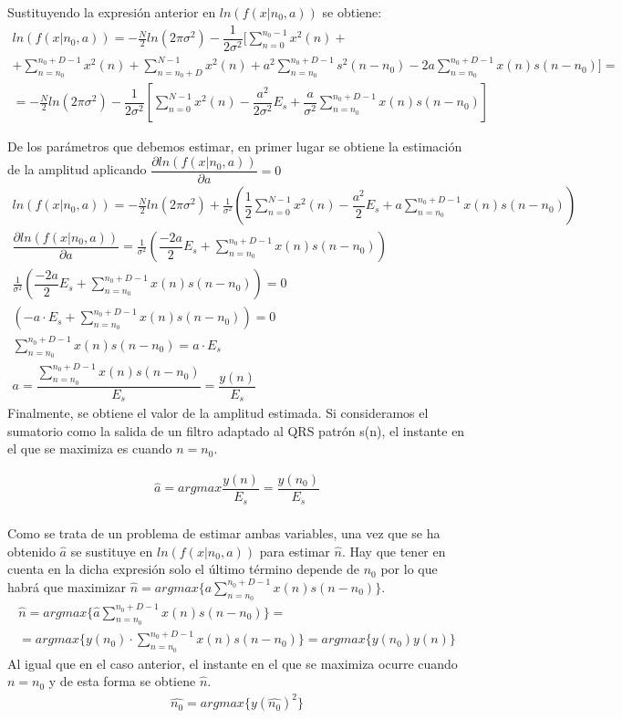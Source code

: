 \documentclass[12pt]{article}
\begin{document}
Sustituyendo la expresión anterior en $ln(f(x|n_0,a))$ se obtiene:
\begin{gather*}
ln(f(x|n_0,a)) = - \frac{N}{2}ln(2\pi\sigma^2) -\dfrac{1}{2\sigma^2} [ \sum_{n=0}^{n_0-1}x^2(n) + \\
+\sum_{n=n_0}^{n_0+D-1}x^2(n) + \sum_{n=n_0+D}^{N-1}x^2(n) + a^2\sum_{n=n_0}^{n_0+D-1}s^2(n-n_0) - 2a\sum_{n=n_0}^{n_0+D-1}x(n)s(n-n_0) ] =\\
=- \frac{N}{2}ln(2\pi\sigma^2) - \dfrac{1}{2\sigma ^2} \left[ \sum_{n=0}^{N-1}x^2(n) - \dfrac{a^2}{2\sigma^2}E_s + \dfrac{a}{\sigma^2}\sum_{n=n_0}^{n_0+D-1}x(n)s(n-n_0)\right] 
\end{gather*}

De los parámetros que debemos estimar, en primer lugar se obtiene la estimación de la amplitud aplicando $\dfrac{\partial ln(f(x|n_0,a))}{\partial a} = 0$
\begin{gather*}
ln(f(x|n_0,a)) = - \frac{N}{2}ln(2\pi\sigma^2) + \frac{1}{\sigma^2} \left( \dfrac{1}{2}\sum_{n=0}^{N-1}x^2(n) -\dfrac{a^2}{2}E_s
+a\sum_{n=n_0}^{n_0+D-1}x(n)s(n-n_0) \right) \\ 
\dfrac{\partial ln(f(x|n_0,a))}{\partial a} = \frac{1}{\sigma^2} \left( \dfrac{-2a}{2} E_s + \sum_{n=n_0}^{n_0+D-1}x(n)s(n-n_0) \right)\\
\frac{1}{\sigma^2} \left( \dfrac{-2a}{2} E_s + \sum_{n=n_0}^{n_0+D-1}x(n)s(n-n_0) \right) =0\\
\left( -a\cdot E_s + \sum_{n=n_0}^{n_0+D-1}x(n)s(n-n_0) \right) =0\\	
\sum_{n=n_0}^{n_0+D-1}x(n)s(n-n_0) = a\cdot E_s\\
a= \dfrac{\sum_{n=n_0}^{n_0+D-1}x(n)s(n-n_0)}{E_s} = \dfrac{y(n)}{E_s}
\end{gather*}
Finalmente, se obtiene el valor de la amplitud estimada. Si consideramos el sumatorio como la salida de un filtro adaptado al QRS patrón s(n), el instante en el que se maximiza es cuando $n=n_0$.

\begin{gather*}
\hat{a} = argmax{\dfrac{y(n)}{E_s}}=\dfrac{y(n_0)}{E_s}
\end{gather*}
\\

Como se trata de un problema de estimar ambas variables, una vez que se ha obtenido $\hat{a}$ se sustituye en $ln(f(x|n_0,a))$ para estimar $\hat{n}$. Hay que tener en cuenta en la dicha expresión solo el último término depende de $n_0$ por lo que habrá que maximizar $\hat{n}= argmax\{ a\sum_{n=n_0}^{n_0+D-1}x(n)s(n-n_0) \}$.
\begin{gather*}
\hat{n} = argmax\{ \hat{a}\sum_{n=n_0}^{n_0+D-1}x(n)s(n-n_0) \} = \\
=argmax\{ y(n_0) \cdot \sum_{n=n_0}^{n_0+D-1}x(n)s(n-n_0) \}
=argmax\{y(n_0) y(n)\}
\end{gather*}
Al igual que en el caso anterior, el instante en el que se maximiza ocurre cuando $n=n_0$ y de esta forma se obtiene $\hat{n}$.
\begin{gather*}
\hat{n_0} = argmax\{y(\hat{n_0})^2\}
\end{gather*}
\end{document}
